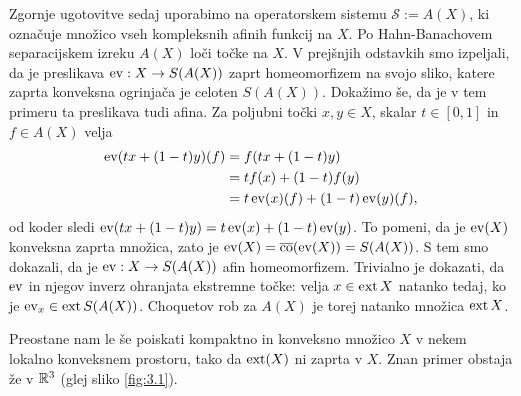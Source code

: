 \begin{zgled}
    Zgornje ugotovitve sedaj uporabimo na operatorskem sistemu $\mathcal{S} := A(X)$, ki označuje množico vseh kompleksnih afinih funkcij na $X$.
    Po Hahn-Banachovem separacijskem izreku $A(X)$ loči točke na $X$.
    V prejšnjih odstavkih smo izpeljali, da je preslikava $\operatorname{ev}: X \to S(A(X))$ zaprt homeomorfizem na svojo sliko,
    katere zaprta konveksna ogrinjača je celoten $S(A(X))$. Dokažimo še, da je v tem primeru ta preslikava tudi afina.
    Za poljubni točki $x, y \in X$, skalar $t \in [0, 1]$ in $f \in A(X)$ velja 
    \begin{align*}
        \operatorname{ev}(tx + (1 - t)y) (f) &= f(tx + (1 - t) y)\\
        &= t f(x) + (1 - t) f(y)\\
        &=t \operatorname{ev} (x) (f)  + (1 - t) \operatorname{ev}(y) (f),
    \end{align*}
    od koder sledi $\operatorname{ev} (tx + (1 - t) y) = t \operatorname{ev}(x) + ( 1 - t) \operatorname{ev}(y)$.
    To pomeni, da je $\operatorname{ev}(X)$ konveksna zaprta množica, zato je $\operatorname{ev}(X) = \overline{\operatorname{co}} (\operatorname{ev}(X)) = S(A(X))$.
    S tem smo dokazali, da je $\operatorname{ev}: X \to S(A(X))$ afin homeomorfizem. Trivialno je dokazati, da $\operatorname{ev}$ in njegov inverz ohranjata ekstremne točke:
    velja $x \in \operatorname{ext} X$ natanko tedaj, ko je $\operatorname{ev}_x \in \operatorname{ext} S(A(X))$.
    Choquetov rob za $A(X)$ je torej natanko množica $\operatorname{ext} X$. 

    Preostane nam le še poiskati kompaktno in konveksno množico $X$ v nekem lokalno konveksnem prostoru,
    tako da $\operatorname{ext} (X)$ ni zaprta v $X$. Znan primer obstaja že v $\mathbb R^3$
    (glej sliko \ref{fig:3.1}).
\end{zgled}


